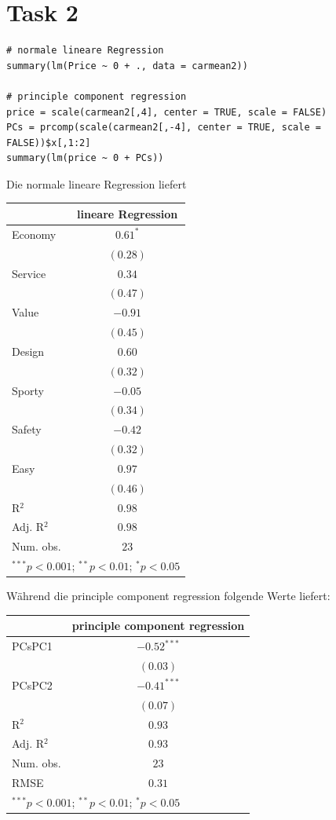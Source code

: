 \documentclass{article}
\begin{document}
	\section*{Task 2}
	\begin{lstlisting}
# normale lineare Regression
summary(lm(Price ~ 0 + ., data = carmean2))

# principle component regression
price = scale(carmean2[,4], center = TRUE, scale = FALSE)
PCs = prcomp(scale(carmean2[,-4], center = TRUE, scale = FALSE))$x[,1:2]
summary(lm(price ~ 0 + PCs))
	\end{lstlisting}
	Die normale lineare Regression liefert
	\begin{center}
\begin{tabular}{l c}
\hline
 & lineare Regression \\
\hline
Economy    & $0.61^{*}$ \\
           & $(0.28)$   \\
Service    & $0.34$     \\
           & $(0.47)$   \\
Value      & $-0.91$    \\
           & $(0.45)$   \\
Design     & $0.60$     \\
           & $(0.32)$   \\
Sporty     & $-0.05$    \\
           & $(0.34)$   \\
Safety     & $-0.42$    \\
           & $(0.32)$   \\
Easy       & $0.97$     \\
           & $(0.46)$   \\
\hline
R$^2$      & $0.98$     \\
Adj. R$^2$ & $0.98$     \\
Num. obs.  & $23$       \\
\hline
\multicolumn{2}{l}{\scriptsize{$^{***}p<0.001$; $^{**}p<0.01$; $^{*}p<0.05$}}
\end{tabular}
\end{center}
	Während die principle component regression folgende Werte liefert:
	\begin{center}
\begin{tabular}{l c}
\hline
 & principle component regression \\
\hline
PCsPC1     & $-0.52^{***}$ \\
           & $(0.03)$      \\
PCsPC2     & $-0.41^{***}$ \\
           & $(0.07)$      \\
\hline
R$^2$      & $0.93$        \\
Adj. R$^2$ & $0.93$        \\
Num. obs.  & $23$          \\
RMSE       & $0.31$        \\
\hline
\multicolumn{2}{l}{\scriptsize{$^{***}p<0.001$; $^{**}p<0.01$; $^{*}p<0.05$}}
\end{tabular}
\end{center}
\end{document}
